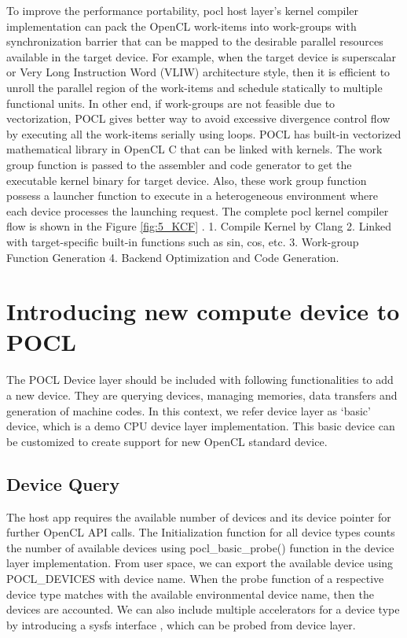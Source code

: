 To improve the performance portability, pocl host layer’s kernel compiler implementation can pack the OpenCL work-items into work-groups with synchronization barrier that can be mapped to the desirable parallel resources available in the target device. For example, when the target device is superscalar or Very Long Instruction Word (VLIW) architecture style, then it is efficient to unroll the parallel region of the work-items and schedule statically to multiple functional units. In other end, if work-groups are not feasible due to vectorization, POCL gives better way to avoid excessive divergence control flow by executing all the work-items serially using loops. POCL has built-in vectorized mathematical library in OpenCL C that can be linked with kernels. The work group function is passed to the assembler and code generator to get the executable kernel binary for target device. Also, these work group function possess a launcher function to execute in a heterogeneous environment where each device processes the launching request. The complete pocl kernel compiler flow is shown in the Figure \ref{fig:5_KCF} \cite{18}. 1. Compile Kernel by Clang 2. Linked with target-specific built-in functions such as sin, cos, etc. 3. Work-group Function Generation 4. Backend Optimization and Code Generation.


\section{Introducing new compute device to POCL}
The POCL Device layer should be included with following functionalities to add a new device. They are querying devices, managing memories, data transfers and generation of machine codes. In this context, we refer device layer as ‘basic’ device, which is a demo CPU device layer implementation. This basic device can be customized to create support for new OpenCL standard device.

\subsection{Device Query}
The host app requires the available number of devices and its device pointer for further OpenCL API calls. The Initialization function for all device types counts the number of available devices using pocl\_basic\_probe() function in the device layer implementation. From user space, we can export the available device using POCL\_DEVICES with device name. When the probe function of a respective device type matches with the available environmental device name, then the devices are accounted. We can also include multiple accelerators for a device type by introducing a sysfs interface \cite{14}, which can be probed from device layer.

